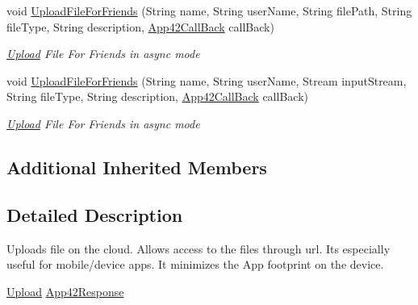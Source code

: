 \begin{DoxyCompactItemize}
void \hyperlink{classcom_1_1shephertz_1_1app42_1_1paas_1_1sdk_1_1csharp_1_1upload_1_1_upload_service_ab5f230ae8a4d0bc5c464f2f4802a69e4}{Upload\+File\+For\+Friends} (String name, String user\+Name, String file\+Path, String file\+Type, String description, \hyperlink{interfacecom_1_1shephertz_1_1app42_1_1paas_1_1sdk_1_1csharp_1_1_app42_call_back}{App42\+Call\+Back} call\+Back)
\begin{DoxyCompactList}\small\item\em \hyperlink{classcom_1_1shephertz_1_1app42_1_1paas_1_1sdk_1_1csharp_1_1upload_1_1_upload}{Upload} File For Friends in async mode \end{DoxyCompactList}\item 
void \hyperlink{classcom_1_1shephertz_1_1app42_1_1paas_1_1sdk_1_1csharp_1_1upload_1_1_upload_service_af1bd864d34f970dbdcb2054ae95109d2}{Upload\+File\+For\+Friends} (String name, String user\+Name, Stream input\+Stream, String file\+Type, String description, \hyperlink{interfacecom_1_1shephertz_1_1app42_1_1paas_1_1sdk_1_1csharp_1_1_app42_call_back}{App42\+Call\+Back} call\+Back)
\begin{DoxyCompactList}\small\item\em \hyperlink{classcom_1_1shephertz_1_1app42_1_1paas_1_1sdk_1_1csharp_1_1upload_1_1_upload}{Upload} File For Friends in async mode \end{DoxyCompactList}\end{DoxyCompactItemize}
\subsection*{Additional Inherited Members}


\subsection{Detailed Description}
Uploads file on the cloud. Allows access to the files through url. Its especially useful for mobile/device apps. It minimizes the App footprint on the device. 

\hyperlink{classcom_1_1shephertz_1_1app42_1_1paas_1_1sdk_1_1csharp_1_1upload_1_1_upload_service}{Upload} \hyperlink{classcom_1_1shephertz_1_1app42_1_1paas_1_1sdk_1_1csharp_1_1upload_1_1_upload_service}{App42\+Response} 

